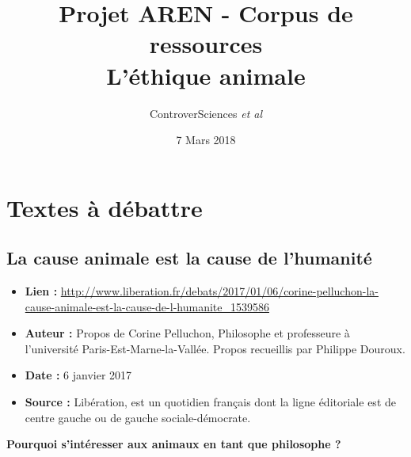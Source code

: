 \documentclass[10pt]{article}
\author{ControverSciences\textit{ et al} }
\title{Projet AREN - Corpus de ressources \\ L’éthique animale}
\date{7 Mars 2018}
\begin{document}
\maketitle

\tableofcontents

\newpage
\section{Textes à débattre}

\subsection{La cause animale est la cause de l’humanité}
\begin{itemize}
	\item \textbf{Lien : }  \url{http://www.liberation.fr/debats/2017/01/06/corine-pelluchon-la-cause-animale-est-la-cause-de-l-humanite_1539586} 
	\item \textbf{Auteur : } Propos de Corine Pelluchon, Philosophe et professeure à l’université Paris-Est-Marne-la-Vallée. Propos recueillis par Philippe Douroux.
	\item \textbf{Date : }  6 janvier 2017
	\item \textbf{Source : }  Libération, est un quotidien français dont la ligne éditoriale est de centre gauche ou de gauche sociale-démocrate.
\end{itemize}

\textbf{Pourquoi s’intéresser aux animaux en tant que philosophe ?}\\
\end{document}
